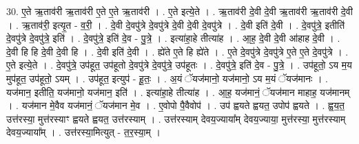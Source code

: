 \documentclass[17pt]{extarticle}
\begin{document}
30. ए॒ते ऋ॒ताव॑री ऋ॒ताव॑री ए॒ते ए॒ते ऋ॒ताव॑री । . ए॒ते इत्ये॒ते । . ऋ॒ताव॑री दे॒वी दे॒वी ऋ॒ताव॑री ऋ॒ताव॑री दे॒वी । . ऋ॒ताव॑री॒ इत्यृ॒त - व॒री॒ । . दे॒वी दे॒वपु॑त्रे दे॒वपु॑त्रे दे॒वी दे॒वी दे॒वपु॑त्रे । . दे॒वी इति॑ दे॒वी । . दे॒वपु॑त्रे॒ इतीति॑ दे॒वपु॑त्रे दे॒वपु॑त्रे॒ इति॑ । . दे॒वपु॑त्रे॒ इति॑ दे॒व - पु॒त्रे॒ । . इत्या॑हा॒हे तीत्या॑ह । . आ॒ह॒ दे॒वी दे॒वी आ॑हाह दे॒वी । . दे॒वी हि हि दे॒वी दे॒वी हि । . दे॒वी इति॑ दे॒वी । . ह्ये॑ते ए॒ते हि ह्ये॑ते । . ए॒ते दे॒वपु॑त्रे दे॒वपु॑त्रे ए॒ते ए॒ते दे॒वपु॑त्रे । . ए॒ते इत्ये॒ते । . दे॒वपु॑त्रे॒ उप॑हूत॒ उप॑हूतो दे॒वपु॑त्रे दे॒वपु॑त्रे॒ उप॑हूतः । . दे॒वपु॑त्रे॒ इति॑ दे॒व - पु॒त्रे॒ । . उप॑हूतो॒ ऽय म॒य मुप॑हूत॒ उप॑हूतो॒ ऽयम् । . उप॑हूत॒ इत्युप॑ - हू॒तः॒ । . अ॒यं ॅयज॑मानो॒ यज॑मानो॒ ऽय म॒यं ॅयज॑मानः । . यज॑मान॒ इतीति॒ यज॑मानो॒ यज॑मान॒ इति॑ । . इत्या॑हा॒हे तीत्या॑ह । . आ॒ह॒ यज॑मानं॒ ॅयज॑मान माहाह॒ यज॑मानम् । . यज॑मान मे॒वैव यज॑मानं॒ ॅयज॑मान मे॒व । . ए॒वोपो पै॒वैवोप॑ । . उप॑ ह्वयते ह्वयत॒ उपोप॑ ह्वयते । . ह्व॒य॒त॒ उत्त॑रस्या॒ मुत्त॑रस्याꣳ ह्वयते ह्वयत॒ उत्त॑रस्याम् । . उत्त॑रस्याम् देवय॒ज्याया᳚म् देवय॒ज्याया॒ मुत्त॑रस्या॒ मुत्त॑रस्याम् देवय॒ज्याया᳚म् । . उत्त॑रस्या॒मित्युत् - त॒र॒स्या॒म् । \newline
\end{document}
